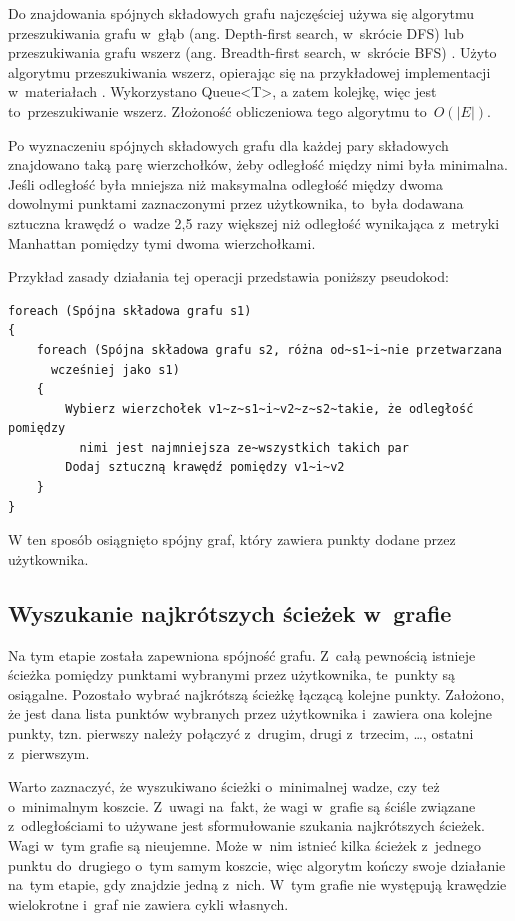 \documentclass[a4paper,11pt,twoside,openright]{report}
\theoremstyle{definition}
\begin{document}
Do znajdowania spójnych składowych grafu najczęściej używa się algorytmu
przeszukiwania grafu w~głąb (ang. Depth-first search, w~skrócie DFS) lub
przeszukiwania grafu wszerz (ang. Breadth-first search, w~skrócie BFS)
\cite{Algorytmy Sedgewick}. Użyto algorytmu przeszukiwania wszerz, opierając się
na przykładowej implementacji w~materiałach \cite{AiSD2}. Wykorzystano Queue<T>,
a zatem kolejkę, więc jest to~przeszukiwanie wszerz. Złożoność obliczeniowa tego
algorytmu to~$O(|E|)$.

Po wyznaczeniu spójnych składowych grafu dla każdej pary składowych znajdowano
taką parę wierzchołków, żeby odległość między nimi była minimalna. Jeśli odległość
była mniejsza niż maksymalna odległość między dwoma dowolnymi punktami zaznaczonymi
przez użytkownika, to~była dodawana sztuczna krawędź o~wadze 2,5 razy większej
niż odległość wynikająca z~metryki Manhattan pomiędzy tymi dwoma wierzchołkami.

Przykład zasady działania tej operacji przedstawia poniższy pseudokod:

\begin{verbatim}
foreach (Spójna składowa grafu s1)
{
    foreach (Spójna składowa grafu s2, różna od~s1~i~nie przetwarzana
      wcześniej jako s1)
    {
        Wybierz wierzchołek v1~z~s1~i~v2~z~s2~takie, że odległość pomiędzy
          nimi jest najmniejsza ze~wszystkich takich par
        Dodaj sztuczną krawędź pomiędzy v1~i~v2
    }
}
\end{verbatim}


W ten sposób osiągnięto spójny graf, który zawiera punkty dodane przez użytkownika.

\subsection {Wyszukanie najkrótszych ścieżek w~grafie}

Na tym etapie została zapewniona spójność grafu. Z~całą pewnością istnieje ścieżka
pomiędzy punktami wybranymi przez użytkownika, te~punkty są osiągalne. Pozostało
wybrać najkrótszą ścieżkę łączącą kolejne punkty. Założono, że jest dana lista
punktów wybranych przez użytkownika i~zawiera ona kolejne punkty, tzn. pierwszy
należy połączyć z~drugim, drugi z~trzecim, \dots, ostatni z~pierwszym.

Warto zaznaczyć, że wyszukiwano ścieżki o~minimalnej wadze, czy też o~minimalnym
koszcie. Z~uwagi na~fakt, że wagi w~grafie są ściśle związane z~odległościami to
używane jest sformułowanie szukania najkrótszych ścieżek. Wagi w~tym grafie są
nieujemne. Może w~nim istnieć kilka ścieżek z~jednego punktu do~drugiego o~tym
samym koszcie, więc algorytm kończy swoje działanie na~tym etapie, gdy znajdzie
jedną z~nich. W~tym grafie nie występują krawędzie wielokrotne i~graf nie zawiera
cykli własnych.
\end{document}
